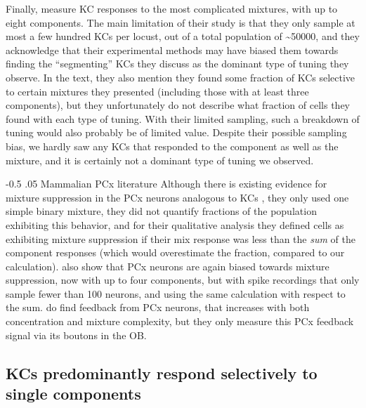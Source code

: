 \documentclass[12pt]{caltech_thesis}
\makeatletter
\renewcommand{\cite}{{ }\autocite}
\let\Oldsubsection\subsection
\renewcommand{\subsection}{\FloatBarrier\Oldsubsection}
\let\Oldsubsubsection\subsubsection
\renewcommand{\subsubsection}{\FloatBarrier\Oldsubsubsection}
\renewcommand\subsubsection{%
    \@startsection{subsubsection}{4}{0mm}%
       {-0.5\baselineskip}%
       {.05\baselineskip}%
       {\normalfont\normalsize\bfseries\itshape}}
\makeatother
\begin{document}
\begin{refsection}
Finally, \textcite{LocustKCMixSpiking} measure KC responses to the most complicated mixtures, with up to eight components.
The main limitation of their study is that they only sample at most a few hundred KCs per locust, out of a total population of \textasciitilde\num{50000}, and they acknowledge that their experimental methods may have biased them towards finding the ``segmenting'' KCs they discuss as the dominant type of tuning they observe.
In the text, they also mention they found some fraction of KCs selective to certain mixtures they presented (including those with at least three components), but they unfortunately do not describe what fraction of cells they found with each type of tuning.
With their limited sampling, such a breakdown of tuning would also probably be of limited value.
Despite their possible sampling bias, we hardly saw any KCs that responded to the component as well as the mixture, and it is certainly not a dominant type of tuning we observed.

\subsubsection{Mammalian PCx literature}
Although there is existing evidence for mixture suppression in the PCx neurons analogous to KCs\cite{PiriformMixSupp}, they only used one simple binary mixture, they did not quantify fractions of the population exhibiting this behavior, and for their qualitative analysis they defined cells as exhibiting mixture suppression if their mix response was less than the \textit{sum} of the component responses (which would overestimate the fraction, compared to our calculation).
\textcite{Rokni2020} also show that PCx neurons are again biased towards mixture suppression, now with up to four components, but with spike recordings that only sample fewer than 100 neurons, and using the same calculation with respect to the sum.
\textcite{Zak2024} do find feedback from PCx neurons, that increases with both concentration and mixture complexity, but they only measure this PCx feedback signal via its boutons in the OB.

\subsection{KCs predominantly respond selectively to single components}


\end{refsection}
\end{document}
